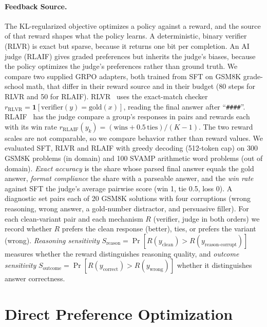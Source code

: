 \documentclass{article}
\begin{document}
\paragraph{Feedback Source.} The KL-regularized objective optimizes a policy against a reward, and the source of that reward shapes what the policy learns. A deterministic, binary verifier (RLVR) is exact but sparse, because it returns one bit per completion. An AI judge (RLAIF) gives graded preferences but inherits the judge's biases, because the policy optimizes the judge's preferences rather than ground truth. We compare two supplied GRPO adapters, both trained from SFT on GSM8K grade-school math, that differ in their reward source and in their budget (80 steps for RLVR and 50 for RLAIF). RLVR~\citep{deepseek2025r1} uses the exact-match checker $r_{\text{RLVR}} = \mathbf{1}[\text{verifier}(y) = \text{gold}(x)]$, reading the final answer after ``\texttt{\#\#\#\#}''. RLAIF~\citep{lee2024rlaif,bai2022constitutional} has the judge compare a group's responses in pairs and rewards each with its win rate $r_{\text{RLAIF}}(y_k) = (\text{wins} + 0.5\,\text{ties})/(K{-}1)$. The two reward scales are not comparable, so we compare behavior rather than reward values. We evaluated SFT, RLVR and RLAIF with greedy decoding (512-token cap) on 300 GSM8K problems (in domain) and 100 SVAMP arithmetic word problems (out of domain). \emph{Exact accuracy} is the share whose parsed final answer equals the gold answer, \emph{format compliance} the share with a parseable answer, and the \emph{win rate} against SFT the judge's average pairwise score (win 1, tie 0.5, loss 0). A diagnostic set pairs each of 20 GSM8K solutions with four corruptions (wrong reasoning, wrong answer, a gold-number distractor, and persuasive filler). For each clean-variant pair and each mechanism $R$ (verifier, judge in both orders) we record whether $R$ prefers the clean response (better), ties, or prefers the variant (wrong). \emph{Reasoning sensitivity} $S_{\text{reason}} = \Pr[R(y_{\text{clean}}) > R(y_{\text{reason-corrupt}})]$ measures whether the reward distinguishes reasoning quality, and \emph{outcome sensitivity} $S_{\text{outcome}} = \Pr[R(y_{\text{correct}}) > R(y_{\text{wrong}})]$ whether it distinguishes answer correctness.


\section{Direct Preference Optimization}
\label{sec:dpo}
\end{document}
